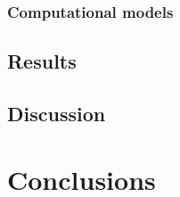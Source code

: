 \subsubsection{Computational models}

\subsection{Results}

\subsection{Discussion}

\section{Conclusions}

